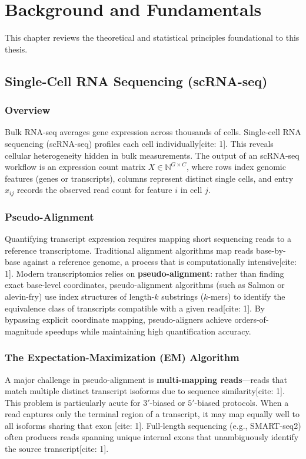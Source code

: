 \chapter{Background and Fundamentals}

This chapter reviews the theoretical and statistical principles foundational to this thesis.

\section{Single-Cell RNA Sequencing (scRNA-seq)}

\subsection{Overview}
Bulk RNA-seq averages gene expression across thousands of cells. Single-cell RNA sequencing (scRNA-seq) profiles each cell individually[cite: 1]. This reveals cellular heterogeneity hidden in bulk measurements. The output of an scRNA-seq workflow is an expression count matrix $X \in \mathbb{N}^{G \times C}$, where rows index genomic features (genes or transcripts), columns represent distinct single cells, and entry $x_{ij}$ records the observed read count for feature $i$ in cell $j$.

\subsection{Pseudo-Alignment}
Quantifying transcript expression requires mapping short sequencing reads to a reference transcriptome. Traditional alignment algorithms map reads base-by-base against a reference genome, a process that is computationally intensive[cite: 1]. Modern transcriptomics relies on \textbf{pseudo-alignment}: rather than finding exact base-level coordinates, pseudo-alignment algorithms (such as Salmon or alevin-fry) use index structures of length-$k$ substrings ($k$-mers) to identify the equivalence class of transcripts compatible with a given read[cite: 1]. By bypassing explicit coordinate mapping, pseudo-aligners achieve orders-of-magnitude speedups while maintaining high quantification accuracy.

\subsection{The Expectation-Maximization (EM) Algorithm}
A major challenge in pseudo-alignment is \textbf{multi-mapping reads}---reads that match multiple distinct transcript isoforms due to sequence similarity[cite: 1]. This problem is particularly acute for $3'$-biased or $5'$-biased protocols. When a read captures only the terminal region of a transcript, it may map equally well to all isoforms sharing that exon [cite: 1]. Full-length sequencing (e.g., SMART-seq2) often produces reads spanning unique internal exons that unambiguously identify the source transcript[cite: 1].


